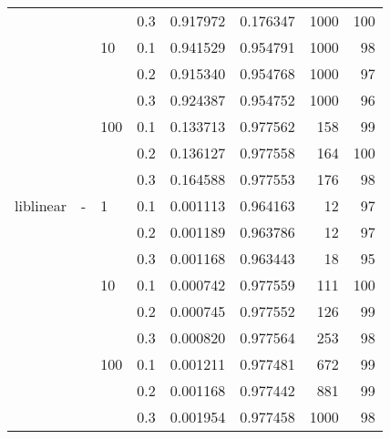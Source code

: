 \begin{table}[H]
\begin{tabular}{llllrrrr}
          &   &     & 0.3 &  0.917972 &  0.176347 &    1000 &   100 \\
          &   & 10  & 0.1 &  0.941529 &  0.954791 &    1000 &    98 \\
          &   &     & 0.2 &  0.915340 &  0.954768 &    1000 &    97 \\
          &   &     & 0.3 &  0.924387 &  0.954752 &    1000 &    96 \\
          &   & 100 & 0.1 &  0.133713 &  0.977562 &     158 &    99 \\
          &   &     & 0.2 &  0.136127 &  0.977558 &     164 &   100 \\
          &   &     & 0.3 &  0.164588 &  0.977553 &     176 &    98 \\
liblinear & - & 1   & 0.1 &  0.001113 &  0.964163 &      12 &    97 \\
          &   &     & 0.2 &  0.001189 &  0.963786 &      12 &    97 \\
          &   &     & 0.3 &  0.001168 &  0.963443 &      18 &    95 \\
          &   & 10  & 0.1 &  0.000742 &  0.977559 &     111 &   100 \\
          &   &     & 0.2 &  0.000745 &  0.977552 &     126 &    99 \\
          &   &     & 0.3 &  0.000820 &  0.977564 &     253 &    98 \\
          &   & 100 & 0.1 &  0.001211 &  0.977481 &     672 &    99 \\
          &   &     & 0.2 &  0.001168 &  0.977442 &     881 &    99 \\
          &   &     & 0.3 &  0.001954 &  0.977458 &    1000 &    98 \\
\bottomrule
\end{tabular}
\end{table}
